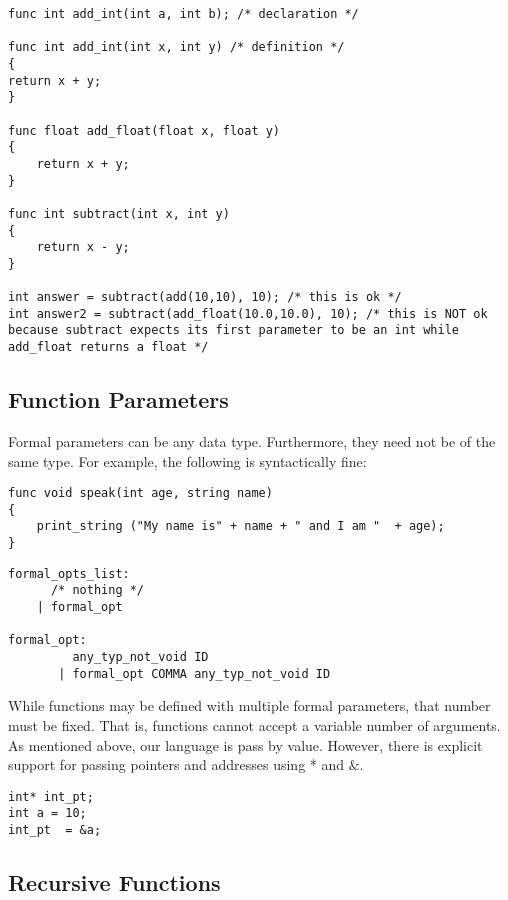 \documentclass{article}
\begin{document}
\begin{lstlisting}
func int add_int(int a, int b); /* declaration */

func int add_int(int x, int y) /* definition */
{
return x + y;
}

func float add_float(float x, float y)
{
	return x + y;
}

func int subtract(int x, int y)
{
	return x - y;
}

int answer = subtract(add(10,10), 10); /* this is ok */
int answer2 = subtract(add_float(10.0,10.0), 10); /* this is NOT ok because subtract expects its first parameter to be an int while add_float returns a float */

\end{lstlisting}

\subsection{Function Parameters}
Formal parameters can be any data type. Furthermore, they need not be of the same type. For example, the following is syntactically fine:

\begin{lstlisting}
func void speak(int age, string name)
{
	print_string ("My name is" + name + " and I am "  + age);
}
\end{lstlisting}


\begin{Verbatim}[frame=single]
formal_opts_list:
	  /* nothing */ 
	| formal_opt 

formal_opt:
	     any_typ_not_void ID 		
	   | formal_opt COMMA any_typ_not_void ID 	
\end{Verbatim}


While functions may be defined with multiple formal parameters, that number must be fixed. That is, functions cannot accept a variable number of arguments. As mentioned above, our language is pass by value. However, there is explicit support for passing pointers and addresses using * and $\&$. 

\begin{lstlisting}
int* int_pt;
int a = 10;
int_pt  = &a;
\end{lstlisting}


\subsection{Recursive Functions}
\end{document}
